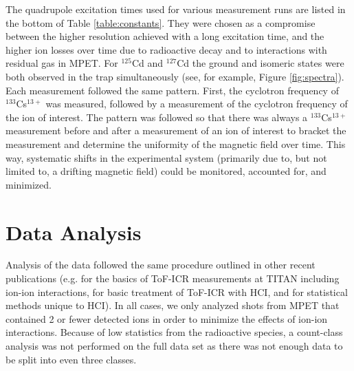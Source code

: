 \documentclass[twocolumn,prc,showpacs,preprintnumbers,amsmath,amssymb,superscriptaddress,nofootinbib,aps,10pt]{revtex4-1}
\begin{document}
The quadrupole excitation times used for various measurement runs are listed in the bottom of Table \ref{table:constants}. They were chosen as a compromise between the higher resolution achieved with a long excitation time, and the higher ion losses over time due to radioactive decay and to interactions with residual gas in MPET. For $^{125}$Cd and $^{127}$Cd the ground and isomeric states were both observed in the trap simultaneously (see, for example, Figure \ref{fig:spectra}). Each measurement followed the same pattern. First, the cyclotron frequency of $^{133}$Cs$^{13+}$ was measured, followed by a measurement of the cyclotron frequency of the ion of interest. The pattern was followed so that there was always a $^{133}$Cs$^{13+}$ measurement before and after a measurement of an ion of interest to bracket the measurement and determine the uniformity of the magnetic field over time. This way, systematic shifts in the experimental system (primarily due to, but not limited to, a drifting magnetic field) could be monitored, accounted for, and minimized. 


\section{Data Analysis}
\label{sec:analysis}

Analysis of the data followed the same procedure outlined in other recent publications (e.g. \cite{Brodeur2009} for the basics of ToF-ICR measurements at TITAN including ion-ion interactions, \cite{Gallant2014} for basic treatment of ToF-ICR with HCI, and \cite{Klawitter2016} for statistical methods unique to HCI). In all cases, we only analyzed shots from MPET that contained 2 or fewer detected ions in order to minimize the effects of ion-ion interactions. Because of low statistics from the radioactive species, a count-class analysis \cite{Kellerbauer2003} was not performed on the full data set as there was not enough data to be split into even three classes. 
\end{document}
